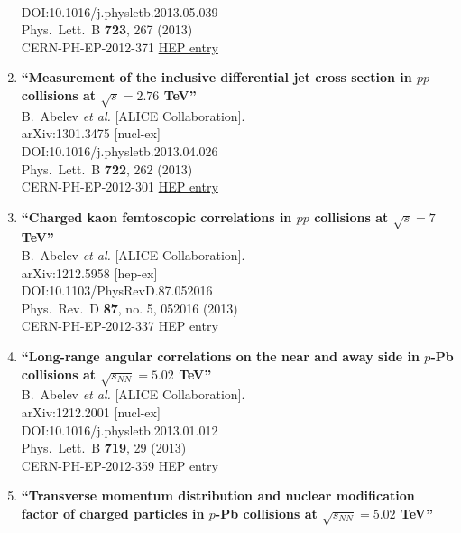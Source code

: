 \begin{enumerate}
  \\{}DOI:10.1016/j.physletb.2013.05.039
  \\{}Phys.\ Lett.\ B {\bf 723}, 267 (2013)
  \\{}CERN-PH-EP-2012-371
\href{http://inspirehep.net/record/1211186}{HEP entry}
\item%
{\bf ``Measurement of the inclusive differential jet cross section in $pp$ collisions at $\sqrt{s} = 2.76$ TeV''}
  \\{}B.~Abelev {\it et al.} [ALICE Collaboration].
  \\{}arXiv:1301.3475 [nucl-ex]
  \\{}DOI:10.1016/j.physletb.2013.04.026
  \\{}Phys.\ Lett.\ B {\bf 722}, 262 (2013)
  \\{}CERN-PH-EP-2012-301
\href{http://inspirehep.net/record/1210881}{HEP entry}
\item%
{\bf ``Charged kaon femtoscopic correlations in $pp$ collisions at $\sqrt{s}=7$ TeV''}
  \\{}B.~Abelev {\it et al.} [ALICE Collaboration].
  \\{}arXiv:1212.5958 [hep-ex]
  \\{}DOI:10.1103/PhysRevD.87.052016
  \\{}Phys.\ Rev.\ D {\bf 87}, no. 5, 052016 (2013)
  \\{}CERN-PH-EP-2012-337
\href{http://inspirehep.net/record/1208696}{HEP entry}
\item%
{\bf ``Long-range angular correlations on the near and away side in $p$-Pb collisions at $\sqrt{s_{NN}}=5.02$ TeV''}
  \\{}B.~Abelev {\it et al.} [ALICE Collaboration].
  \\{}arXiv:1212.2001 [nucl-ex]
  \\{}DOI:10.1016/j.physletb.2013.01.012
  \\{}Phys.\ Lett.\ B {\bf 719}, 29 (2013)
  \\{}CERN-PH-EP-2012-359
\href{http://inspirehep.net/record/1206610}{HEP entry}
\item%
{\bf ``Transverse momentum distribution and nuclear modification factor of charged particles in $p$-Pb collisions at $\sqrt{s_{NN}}=5.02$ TeV''}

\end{enumerate}

